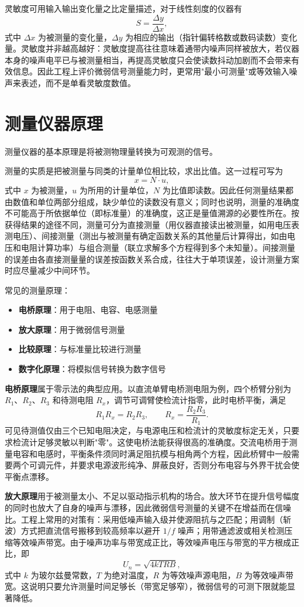 灵敏度可用输入输出变化量之比定量描述，对于线性刻度的仪器有
\[
S = \frac{\Delta y}{\Delta x},
\]
式中 $\Delta x$ 为被测量的变化量，$\Delta y$ 为相应的输出（指针偏转格数或数码读数）变化量。灵敏度并非越高越好：灵敏度提高往往意味着通带内噪声同样被放大，若仪器本身的噪声电平已与被测量相当，再提高灵敏度只会使读数抖动加剧而不会带来有效信息。因此工程上评价微弱信号测量能力时，更常用"最小可测量"或等效输入噪声来表述，而不是单看灵敏度数值。

\section{测量仪器原理}
\label{sec:measurement_principle}

测量仪器的基本原理是将被测物理量转换为可观测的信号。

测量的实质是把被测量与同类的计量单位相比较，求出比值。这一过程可写为
\[
x = N \cdot u,
\]
式中 $x$ 为被测量，$u$ 为所用的计量单位，$N$ 为比值即读数。因此任何测量结果都由数值和单位两部分组成，缺少单位的读数没有意义；同时也说明，测量的准确度不可能高于所依据单位（即标准量）的准确度，这正是量值溯源的必要性所在。按获得结果的途径不同，测量可分为直接测量（用仪器直接读出被测量，如用电压表测电压）、间接测量（测出与被测量有确定函数关系的其他量后计算得出，如由电压和电阻计算功率）与组合测量（联立求解多个方程得到多个未知量）。间接测量的误差由各直接测量量的误差按函数关系合成，往往大于单项误差，设计测量方案时应尽量减少中间环节。

常见的测量原理：
\begin{itemize}
    \item \textbf{电桥原理}：用于电阻、电容、电感测量
    \item \textbf{放大原理}：用于微弱信号测量
    \item \textbf{比较原理}：与标准量比较进行测量
    \item \textbf{数字化原理}：将模拟信号转换为数字信号
\end{itemize}

\textbf{电桥原理}属于零示法的典型应用。以直流单臂电桥测电阻为例，四个桥臂分别为 $R_1$、$R_2$、$R_3$ 和待测电阻 $R_x$，调节可调臂使检流计指零，此时电桥平衡，满足
\[
R_1 R_x = R_2 R_3, \qquad R_x = \frac{R_2 R_3}{R_1}.
\]
可见待测值仅由三个已知电阻决定，与电源电压和检流计的灵敏度标定无关，只要求检流计足够灵敏以判断"零"。这使电桥法能获得很高的准确度。交流电桥用于测量电容和电感时，平衡条件须同时满足阻抗模与相角两个方程，因此桥臂中一般需要两个可调元件，并要求电源波形纯净、屏蔽良好，否则分布电容与外界干扰会使平衡点漂移。

\textbf{放大原理}用于被测量太小、不足以驱动指示机构的场合。放大环节在提升信号幅度的同时也放大了自身的噪声与漂移，因此微弱信号测量的关键不在增益而在信噪比。工程上常用的对策有：采用低噪声输入级并使源阻抗与之匹配；用调制（斩波）方式把直流信号搬移到较高频率以避开 $1/f$ 噪声；用带通滤波或相关检测压缩等效噪声带宽。由于噪声功率与带宽成正比，等效噪声电压与带宽的平方根成正比，即
\[
U_n = \sqrt{4kTRB},
\]
式中 $k$ 为玻尔兹曼常数，$T$ 为绝对温度，$R$ 为等效噪声源电阻，$B$ 为等效噪声带宽。这说明只要允许测量时间足够长（带宽足够窄），微弱信号的可测下限就能显著降低。

